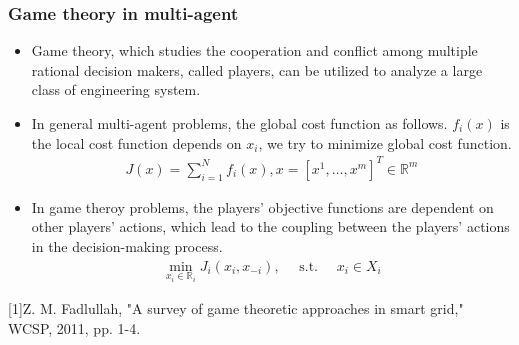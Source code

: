 \begin{frame}
\frametitle{\normalsize{Game theory in multi-agent}}\transwipe

\begin{itemize}
\item \textcolor[rgb]{0.00,0.00,1.00}{Game theory}, which studies the cooperation and conflict among multiple rational decision makers, called players, can be utilized to analyze a large class of engineering system.
\item In general multi-agent problems, the global cost function as follows. $f_i(x)$ is the local cost function depends on $x_i$, we try to minimize global cost function.
\vspace{6pt}
\begin{equation}
\begin{split}
 J(x)=\sum_{i=1}^N f_i(x), x=\left[x^1, \ldots, x^m\right]^T \in \mathbb{R}^m
\end{split}
\end{equation}

\item In game theroy problems, the players’ objective functions are dependent on \textcolor[rgb]{0.00,0.00,1.00}{other players’ actions}, which lead to the coupling between the players’ actions in the decision-making process. 
 \vspace{6pt}
 \begin{equation}
 \begin{split}
  \min _{x_i \in \mathbb{R}_i} J_i\left(x_i, x_{-i}\right), \quad \text { s.t. } \quad x_i \in X_i \end{split}
 \end{equation}
\end{itemize}
\breference
\scriptsize
[1]Z. M. Fadlullah, "A survey of game theoretic approaches in smart grid," WCSP, 2011, pp. 1-4.\par
\ereference
\end{frame}


